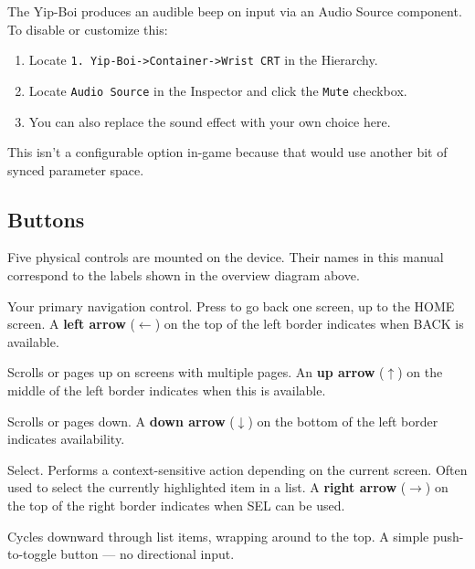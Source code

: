 \documentclass[10pt]{article}
\begin{document}
The Yip-Boi produces an audible beep on input via an Audio Source component. To disable or customize this:

\begin{enumerate}[leftmargin=2em, nosep]
  \item Locate \texttt{1. Yip-Boi->Container->Wrist CRT} in the Hierarchy.
  \item Locate \texttt{Audio Source} in the Inspector and click the \texttt{Mute} checkbox.
  \item You can also replace the sound effect with your own choice here.
\end{enumerate}

\begin{notebox}
This isn't a configurable option in-game because that would use another bit of synced parameter space.
\end{notebox}

\subsection{Buttons}

Five physical controls are mounted on the device. Their names in this manual correspond to the labels shown in the overview diagram above.

\begin{description}[style=nextline, leftmargin=1em, font=\bfseries\ttfamily]
  \item[BACK (Top Left)]
    Your primary navigation control. Press to go back one screen, up to the HOME screen. A \textbf{left arrow} ($\leftarrow$) on the top of the left border indicates when BACK is available.

  \item[PAGE UP (Middle Left)]
    Scrolls or pages up on screens with multiple pages. An \textbf{up arrow} ($\uparrow$) on the middle of the left border indicates when this is available.

  \item[PAGE DOWN (Bottom Left)]
    Scrolls or pages down. A \textbf{down arrow} ($\downarrow$) on the bottom of the left border indicates availability.

  \item[SEL (Top Right)]
    Select. Performs a context-sensitive action depending on the current screen. Often used to select the currently highlighted item in a list. A \textbf{right arrow} ($\rightarrow$) on the top of the right border indicates when SEL can be used.

  \item[SCROLL DOWN / Joystick (Bottom Right)]
    Cycles downward through list items, wrapping around to the top. A simple push-to-toggle button --- no directional input.
\end{description}
\end{document}
